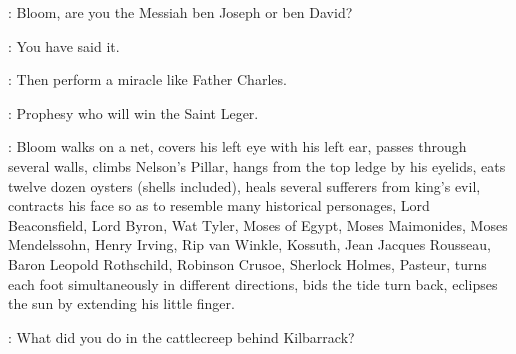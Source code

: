 \Voice:
Bloom, are you the Messiah ben Joseph or ben David?

\Bloom:
You have said it.

\BrotherBuzz[2]:
Then perform a miracle like Father Charles.

\BantamLyons[2]:
Prophesy who will win the Saint Leger.%

:
Bloom walks on a net, covers his left eye with his left ear,
passes through several walls, climbs Nelson's Pillar,
hangs from the top ledge by his eyelids,
eats twelve dozen oysters (shells included),
heals several sufferers from king's evil,
contracts his face so as to resemble many historical personages,
Lord Beaconsfield, Lord Byron, Wat Tyler,
Moses of Egypt, Moses Maimonides, Moses Mendelssohn, Henry Irving,
Rip van Winkle, Kossuth, Jean Jacques Rousseau, Baron Leopold Rothschild,
Robinson Crusoe, Sherlock Holmes, Pasteur,
turns each foot simultaneously in different directions,
bids the tide turn back,
eclipses the sun by extending his little finger.



\Crab:
What did you do in the cattlecreep behind Kilbarrack?

